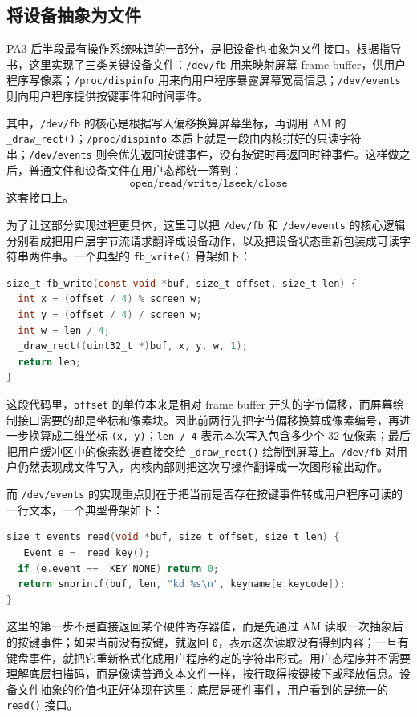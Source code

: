 \documentclass[a4paper]{article}
\begin{document}
\subsection{将设备抽象为文件}
PA3 后半段最有操作系统味道的一部分，是把设备也抽象为文件接口。根据指导书，这里实现了三类关键设备文件：\texttt{/dev/fb} 用来映射屏幕 frame buffer，供用户程序写像素；\texttt{/proc/dispinfo} 用来向用户程序暴露屏幕宽高信息；\texttt{/dev/events} 则向用户程序提供按键事件和时间事件。

其中，\texttt{/dev/fb} 的核心是根据写入偏移换算屏幕坐标，再调用 AM 的 \texttt{\_draw\_rect()}；\texttt{/proc/dispinfo} 本质上就是一段由内核拼好的只读字符串；\texttt{/dev/events} 则会优先返回按键事件，没有按键时再返回时钟事件。这样做之后，普通文件和设备文件在用户态都统一落到：
\[
\texttt{open/read/write/lseek/close}
\]
这套接口上。

为了让这部分实现过程更具体，这里可以把 \texttt{/dev/fb} 和 \texttt{/dev/events} 的核心逻辑分别看成把用户层字节流请求翻译成设备动作，以及把设备状态重新包装成可读字符串两件事。一个典型的 \texttt{fb\_write()} 骨架如下：
\begin{lstlisting}[language=C]
size_t fb_write(const void *buf, size_t offset, size_t len) {
  int x = (offset / 4) % screen_w;
  int y = (offset / 4) / screen_w;
  int w = len / 4;
  _draw_rect((uint32_t *)buf, x, y, w, 1);
  return len;
}
\end{lstlisting}

这段代码里，\texttt{offset} 的单位本来是相对 frame buffer 开头的字节偏移，而屏幕绘制接口需要的却是坐标和像素块。因此前两行先把字节偏移换算成像素编号，再进一步换算成二维坐标 \texttt{(x, y)}；\texttt{len / 4} 表示本次写入包含多少个 32 位像素；最后把用户缓冲区中的像素数据直接交给 \texttt{\_draw\_rect()} 绘制到屏幕上。\texttt{/dev/fb} 对用户仍然表现成文件写入，内核内部则把这次写操作翻译成一次图形输出动作。

而 \texttt{/dev/events} 的实现重点则在于把当前是否存在按键事件转成用户程序可读的一行文本，一个典型骨架如下：
\begin{lstlisting}[language=C]
size_t events_read(void *buf, size_t offset, size_t len) {
  _Event e = _read_key();
  if (e.event == _KEY_NONE) return 0;
  return snprintf(buf, len, "kd %s\n", keyname[e.keycode]);
}
\end{lstlisting}

这里的第一步不是直接返回某个硬件寄存器值，而是先通过 AM 读取一次抽象后的按键事件；如果当前没有按键，就返回 \texttt{0}，表示这次读取没有得到内容；一旦有键盘事件，就把它重新格式化成用户程序约定的字符串形式。用户态程序并不需要理解底层扫描码，而是像读普通文本文件一样，按行取得按键按下或释放信息。设备文件抽象的价值也正好体现在这里：底层是硬件事件，用户看到的是统一的 \texttt{read()} 接口。
\end{document}
